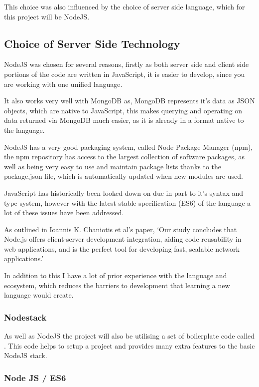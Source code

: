 This choice was also influenced by the choice of server side language, which for this project will be NodeJS. 

\subsection{Choice of Server Side Technology}
NodeJS was chosen for several reasons, firstly as both server side and client side portions of the code are written in JavaScript, it is easier to develop, since you are working with one unified language. 

It also works very well with MongoDB as, MongoDB represents it's data as JSON objects, which are native to JavaScript, this makes querying and operating on data returned via MongoDB much easier, as it is already in a format native to the language. 

NodeJS has a very good packaging system, called Node Package Manager (npm), the npm repository has access to the largest collection of software packages, as well as being very easy to use and maintain package lists thanks to the package.json file, which is automatically updated when new modules are used. 

JavaScript has historically been looked down on due in part to it's syntax and type system, however with the latest stable specification\cite{es6} (ES6) of the language a lot of these issues have been addressed. 

As outlined in Ioannis K. Chaniotis et al's paper, `Our study concludes that Node.js offers client-server development integration, aiding code reusability in web applications, and is the perfect tool for developing fast, scalable network applications.'\cite{node-perf}

In addition to this I have a lot of prior experience with the language and ecosystem, which reduces the barriers to development that learning a new language would create. 

\subsubsection{Nodestack}
As well as NodeJS the project will also be utilising a set of boilerplate code called \cite{nodestack}. This code helps to setup a project and provides many extra features to the basic NodeJS stack. 

\subsubsection*{Node JS / ES6}

